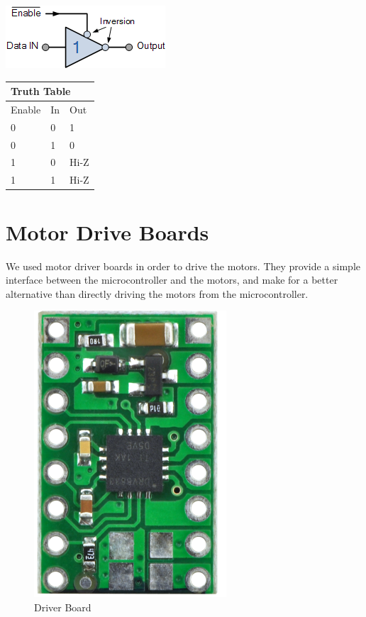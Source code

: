 \begin{minipage}{0.45\textwidth}
	\includegraphics[width=\textwidth]{figures/move/motor53}
\end{minipage}
\hfill
\begin{minipage}{0.45\textwidth}
	\centering
	\begin{tabular}{|l|l|l|}
	\hline
	\multicolumn{3}{|l|}{Truth Table} \\ \hline
	Enable      & In      & Out       \\ \hline
	0           & 0       & 1	      \\ \hline
	0           & 1       & 0	      \\ \hline
	1           & 0       & Hi-Z      \\ \hline
	1           & 1       & Hi-Z      \\ \hline
	\end{tabular}
\end{minipage}

\section{Motor Drive Boards}\label{sec:driver_boards}
We used motor driver boards in order to drive the motors. They provide a simple interface between the microcontroller and the motors, and make for a better alternative than directly driving the motors from the microcontroller.
\begin{figure}[htp]
	\centering
	\includegraphics[scale=0.5]{figures/move/driver_board}
	\caption{Driver Board}
\end{figure}
\clearpage
